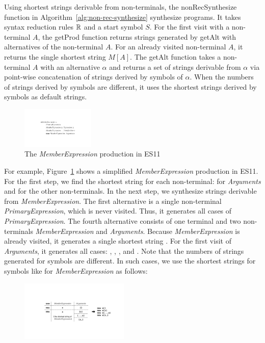 Using shortest strings derivable from non-terminals, 
the \textsf{nonRecSynthesize} function in Algorithm~\ref{alg:non-rec-synthesize}
synthesize programs.  It takes syntax reduction rules $\mathbb{R}$ and a start symbol $S$.
For the first visit with a non-terminal $A$, the \textsf{getProd} function returns
strings generated by \textsf{getAlt} with alternatives of the non-terminal $A$.
For an already visited non-terminal $A$, it returns the single shortest string $M[A]$.
The \textsf{getAlt} function takes a non-terminal $A$ with an alternative
$\alpha$ and returns a set of strings derivable from $\alpha$ via
point-wise concatenation of strings derived by symbols of $\alpha$.
When the numbers of strings derived by symbols are different,
it uses the shortest strings derived by symbols as default strings.

\begin{figure}[t]
  \centering
  \includegraphics[width=0.31\textwidth]{img/syntax-member.pdf}
  \caption{The \textit{MemberExpression} production in ES11}
  \label{fig:prod-example}
  \vspace*{-1em}
\end{figure}

For example, Figure~\ref{fig:prod-example} shows a simplified
\textit{MemberExpression} production in ES11.  For the first step, we find
the shortest string for each non-terminal: \code{()} for \textit{Arguments} and
 for the other non-terminals.  In the next step, we synthesize strings
derivable from \textit{MemberExpression}.  The first alternative is a
single non-terminal \textit{PrimaryExpression}, which is never visited.
Thus, it generates all cases of \textit{PrimaryExpression}.  The fourth
alternative consists of one terminal  and two non-terminals
\textit{MemberExpression} and \textit{Arguments}.  Because \textit{MemberExpression}
is already visited, it generates a single shortest string .
For the first visit of \textit{Arguments}, it generates all cases:
\code{()}, , , and .
Note that the numbers of strings generated for symbols are different.
In such cases, we use the shortest strings for symbols like
 for \textit{MemberExpression} as follows:

\vspace*{-.5em}
\begin{figure}[H]
  \centering
  \includegraphics[width=0.46\textwidth]{img/member-example.pdf}
\end{figure}
\vspace*{-.5em}

